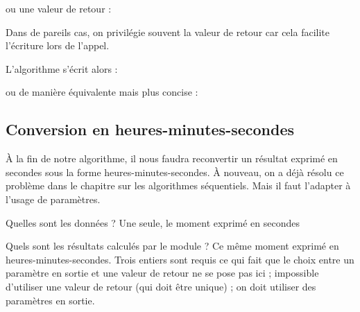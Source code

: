	
	ou une valeur de retour :


	Dans de pareils cas, 
	on privilégie souvent la valeur de retour car cela
	facilite l'écriture lors de l'appel.

	L'algorithme s'écrit alors :


	ou de manière équivalente mais plus concise :


\subsection{Conversion en heures-minutes-secondes}

	À la fin de notre algorithme, il nous faudra reconvertir un résultat
	exprimé en secondes sous la forme heures-minutes-secondes. À nouveau,
	on a déjà résolu ce problème dans le chapitre sur les algorithmes
	séquentiels. Mais il faut l'adapter à
	l'usage de paramètres.

	\begin{liste}
	\item {
		Quelles sont les données ? Une seule, le moment exprimé en secondes}
	\item {
		Quels sont les résultats calculés par le module ? Ce même moment exprimé
		en heures-minutes-secondes. Trois entiers sont requis ce qui fait que
		le choix entre un paramètre en sortie et une valeur de retour ne se
		pose pas ici ; impossible d'utiliser une valeur de
		retour (qui doit être unique) ; on doit utiliser des paramètres en
		sortie.}
	\end{liste}

